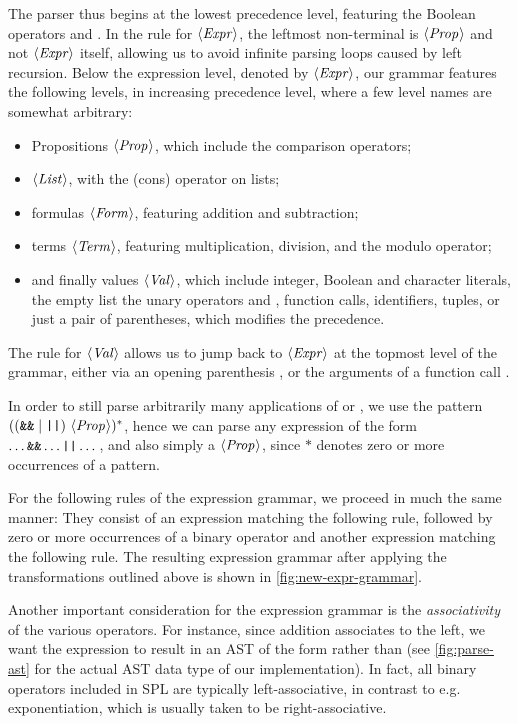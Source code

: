 The parser thus begins at the lowest precedence level, featuring the Boolean
operators \code{\&\&} and \code{||}.
In the rule for $\langle \textit{Expr}\kern.7pt \rangle$, the leftmost non-terminal is $\langle \textit{Prop}\kern.7pt \rangle$ and not
$\langle \textit{Expr}\kern.7pt \rangle$ itself, allowing us to avoid infinite parsing loops caused by left
recursion. Below the expression level, denoted by $\langle \textit{Expr}\kern.7pt \rangle$, our grammar
features the following levels, in increasing precedence level, where a few level
names are somewhat arbitrary:
\begin{itemize}
  \item Propositions $\langle \textit{Prop}\kern.7pt \rangle$, which include the comparison operators;
  \item $\langle \textit{List}\kern.7pt \rangle$, with the \spl{:} (cons) operator on lists;
  \item formulas $\langle \textit{Form}\kern.7pt \rangle$, featuring addition and subtraction;
  \item terms $\langle \textit{Term}\kern.7pt \rangle$, featuring multiplication, division, and the modulo
        operator;
  \item and finally values $\langle \textit{Val}\kern.7pt \rangle$, which include integer, Boolean and
        character literals, the empty list \spl{[]} the unary operators \spl{!}
        and \spl{-}, function calls, identifiers, tuples, or just a pair of
        parentheses, which modifies the precedence.
\end{itemize}

The rule for $\langle \textit{Val}\kern.7pt \rangle$ allows us to jump back to $\langle \textit{Expr}\kern.7pt \rangle$ at the topmost
level of the grammar, either via an opening parenthesis \spl{(}, or the
arguments of a function call .

In order to still parse arbitrarily many applications of \code{\&\&} or
\code{||}, we use the pattern $((\texttt{\&\&} \mid \texttt{||})\ \langle \textit{Prop}\kern.7pt \rangle)^*$,
hence we can parse any expression of the form $\dots \texttt{\&\&} \dots \texttt{||} \dots$,
and also simply a $\langle \textit{Prop}\kern.7pt \rangle$, since $*$ denotes zero or more occurrences of
a pattern.

For the following rules of the expression grammar, we proceed in much the same
manner: They consist of an expression matching the following rule, followed
by zero or more occurrences of a binary operator and another expression matching
the following rule. The resulting expression grammar after applying the
transformations outlined above is shown in \cref{fig:new-expr-grammar}.


Another important consideration for the expression grammar is the
\emph{associativity} of the various operators. For instance, since addition
associates to the left, we want the expression  to result in an AST
of the form  rather than  (see
\cref{fig:parse-ast} for the actual AST data type of our implementation).
In fact, all binary operators included in SPL are typically left-associative, in
contrast to e.g. exponentiation, which is usually taken to be right-associative.

